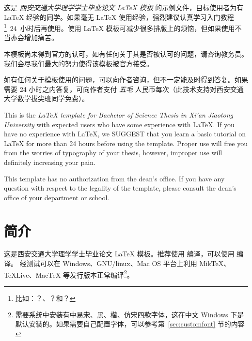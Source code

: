 \documentclass[%
               amsthm,
              ]{xjtubsc}
\begin{document}
\extrapages %

\begin{abstractcn} %
这是 \emph{西安交通大学理学学士毕业论文 \LaTeX{} 模板} 的示例文件，目标使用者为有 \LaTeX{} 经验的同学。如果毫无 \LaTeX{} 使用经验，强烈建议认真学习入门教程\footnote{比如：？、？和？}~24~小时后再使用。使用 LaTeX 模板可减少很多排版上的烦恼，但如果使用不当亦会增加痛苦。

本模板尚未得到官方的认可，如有任何关于其是否被认可的问题，请咨询教务员。我们会尽我们最大的努力使得该模板被官方接受。

如有任何关于模板使用的问题，可以向作者咨询，但不一定能及时得到答复。如果需要 24 小时之内答复，可向作者支付 \emph{五毛} 人民币每次（此技术支持对西安交通大学数学拔尖班同学免费）。

\end{abstractcn}


\begin{abstracten} %

This is the \emph{\LaTeX{} template for Bachelor of Science Thesis in Xi'an Jiaotong University} with expected users who have some experience with \LaTeX{}. If you have no experience with \LaTeX{}, we SUGGEST that you learn a basic tutorial on \LaTeX{} for more than 24 hours before using the template. Proper use will free you from the worries of typography of your thesis, however, improper use will definitely increasing your pain.

This template has no authorization from the dean's office. If you have any question with respect to the legality of the template, please consult the dean's office of your department or school.

\end{abstracten}


\tableofcontents %


\mainmatter


\section{简介}
这是西安交通大学理学学士毕业论文 \LaTeX{} 模板。推荐使用  编译，可以使用  编译。
经测试可以在 Windows、GNU/linux、Mac OS 平台上利用 MikTeX、TeXLive、MacTeX 等发行版本正常编译\footnote{需要系统中安装有中易宋、黑、楷、仿宋四款字体，这在中文 Windows 下是默认安装的。如果需要自己配置字体，可以参考第~\ref{sec:customfont} 节的内容}。
\end{document}
